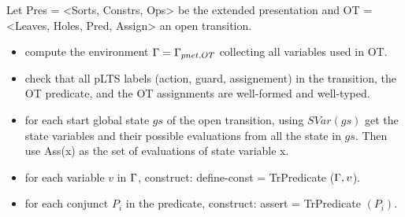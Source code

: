 \documentclass{lncs/llncs}
\newcommand{\TODO}[1]{\textcolor{red}{\textbf{[TODO:#1]}}}
\begin{document}
Let Pres = <Sorts, Constrs, Ops> be the extended presentation
and OT = <Leaves, Holes, Pred, Assign> an open transition.
\begin{itemize}
\item compute the environment $\Gamma=\Gamma_{pnet,OT}$ collecting
all variables used in OT.
\item check that all pLTS labels (action, guard, assignement) in
the transition, the OT predicate, and the OT assignments are
well-formed and well-typed.
\item for each start global state $gs$ of the open transition, using $SVar(gs)$
  get the state variables and their possible evaluations from all the state in $gs$.
  Then use Ass(x) as the set of evaluations of state variable x.
\item for each variable $v$ in $\Gamma$, construct:
  define-const = TrPredicate ($\Gamma ,v$).
\item for each conjunct $P_i$ in the predicate, construct:
  assert = TrPredicate $(P_i)$.
\end{itemize}

\end{document}

